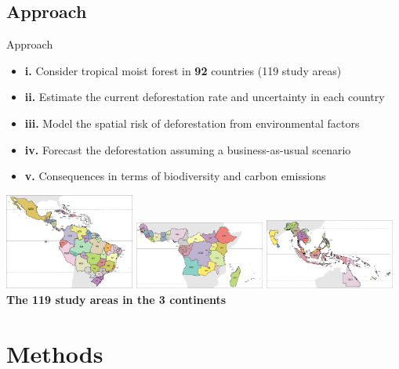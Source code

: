 \documentclass[10pt,table,dvipsnames,compress]{beamer}
\begin{document}
\subsection{Approach}
\label{sec:org1242cc3}
\begin{frame}[label={sec:org51856ad}]{Approach}
\begin{itemize}
\item \textbf{i.} Consider tropical moist forest in \textbf{92} countries (119 study areas)
\item \textbf{ii.} Estimate the current deforestation rate and uncertainty in each country
\item \textbf{iii.} Model the spatial risk of deforestation from environmental factors
\item \textbf{iv.} Forecast the deforestation assuming a business-as-usual scenario
\item \textbf{v.} Consequences in terms of biodiversity and carbon emissions
\end{itemize}

\vspace{0.5cm}
\begin{center}
\includegraphics[width=0.32\textwidth]{figs/sm/study_areas_America}
\includegraphics[width=0.32\textwidth]{figs/sm/study_areas_Africa}
\includegraphics[width=0.32\textwidth]{figs/sm/study_areas_Asia}
\textbf{The 119 study areas in the 3 continents}
\end{center}
\end{frame}

\section{Methods}
\label{sec:orge5dcb9a}
\end{document}
